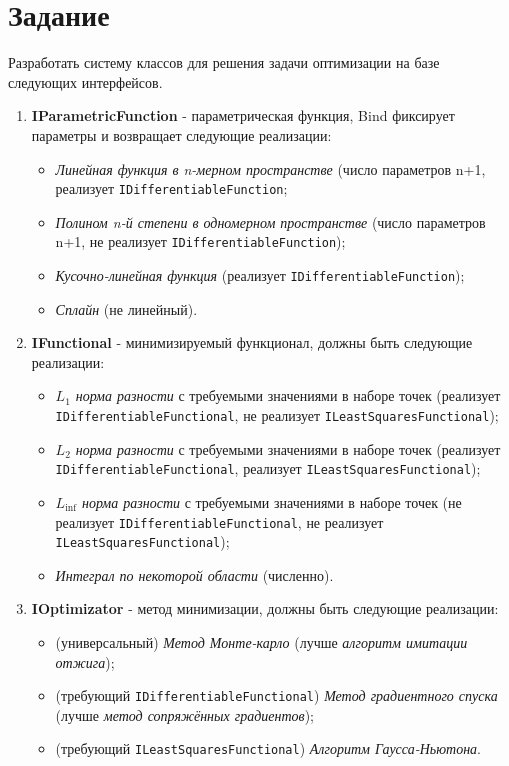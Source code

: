 \chapter*{Задание}


Разработать систему классов для решения задачи оптимизации на базе следующих интерфейсов.

\begin{enumerate}
	\item \textbf{IParametricFunction} - параметрическая функция, \textsf{Bind} фиксирует параметры и возвращает следующие реализации:
	\begin{itemize}
		\item \textsl{Линейная функция в n-мерном пространстве} (число параметров n+1, реализует \texttt{IDifferentiableFunction};
		\item \textsl{Полином n-й степени в одномерном пространстве} (число параметров n+1, не реализует \texttt{IDifferentiableFunction});
		\item \textsl{Кусочно-линейная функция} (реализует \texttt{IDifferentiableFunction});
		\item \textsl{Сплайн} (не линейный).
	\end{itemize}
	\item \textbf{IFunctional} - минимизируемый функционал, должны быть следующие реализации:
	\begin{itemize}
		\item \textsl{$L_1$ норма разности} с требуемыми значениями в наборе точек (реализует \texttt{IDifferentiableFunctional}, не реализует \texttt{ILeastSquaresFunctional});
		\item \textsl{$L_2$ норма разности} с требуемыми значениями в наборе точек (реализует \texttt{IDifferentiableFunctional}, реализует \texttt{ILeastSquaresFunctional});
		\item \textsl{$L_{\inf}$ норма разности} с требуемыми значениями в наборе точек (не реализует \texttt{IDifferentiableFunctional}, не реализует \texttt{ILeastSquaresFunctional});
		\item \textsl{Интеграл по некоторой области} (численно).
	\end{itemize}
	\item \textbf{IOptimizator} - метод минимизации, должны быть следующие реализации:
	\begin{itemize}
		\item (универсальный) \textsl{Метод Монте-карло} (лучше \textsl{алгоритм имитации отжига});
		\item (требующий \texttt{IDifferentiableFunctional}) \textsl{Метод градиентного спуска} (лучше \textsl{метод сопряжённых градиентов});
		\item (требующий \texttt{ILeastSquaresFunctional}) \textsl{Алгоритм Гаусса-Ньютона}.
	\end{itemize}
\end{enumerate}




